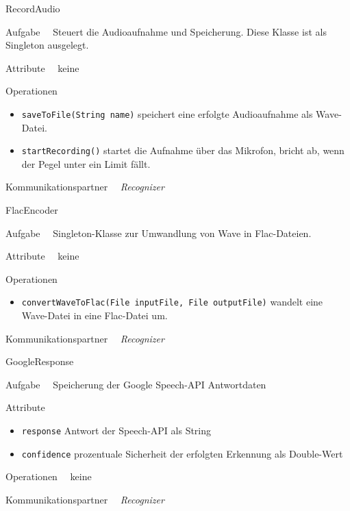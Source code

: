 \begin{class}{10}{RecordAudio}
\item[Aufgabe]~\
Steuert die Audioaufnahme und Speicherung. Diese Klasse ist als Singleton
ausgelegt.
\item[Attribute]~\
keine
\item[Operationen]~\
\begin{itemize}
    \item \texttt{saveToFile(String name)} speichert eine erfolgte Audioaufnahme
    als Wave-Datei.
    \item \texttt{startRecording()} startet die Aufnahme über das Mikrofon,
    bricht ab, wenn der Pegel unter ein Limit fällt.
\end{itemize}
\item[Kommunikationspartner]~\
\textit{Recognizer}
\end{class}

\begin{class}{10}{FlacEncoder}
\item[Aufgabe]~\
Singleton-Klasse zur Umwandlung von Wave in Flac-Dateien.
\item[Attribute]~\
keine
\item[Operationen]~\
\begin{itemize}
    \item \texttt{convertWaveToFlac(File inputFile, File outputFile)} wandelt
    eine Wave-Datei in eine Flac-Datei um.
\end{itemize}
\item[Kommunikationspartner]~\
\textit{Recognizer}
\end{class}

\begin{class}{10}{GoogleResponse}
\item[Aufgabe]~\
Speicherung der Google Speech-API Antwortdaten
\item[Attribute]~\
\begin{itemize}
    \item \texttt{response} Antwort der Speech-API als String
    \item \texttt{confidence} prozentuale Sicherheit der erfolgten Erkennung als
    Double-Wert
\end{itemize}
\item[Operationen]~\
keine
\item[Kommunikationspartner]~\
\textit{Recognizer}
\end{class}

